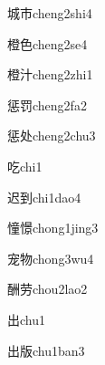 \begin{verbete}[9;5]{城市}{cheng2shi4}
\end{verbete}

\begin{verbete}[16;6]{橙色}{cheng2se4}
\end{verbete}

\begin{verbete}[16;5]{橙汁}{cheng2zhi1}
\end{verbete}

\begin{verbete}[12;9]{惩罚}{cheng2fa2}
\end{verbete}

\begin{verbete}[12;5]{惩处}{cheng2chu3}
\end{verbete}

\begin{verbete}[6]{吃}{chi1}
\end{verbete}

\begin{verbete}[7;8]{迟到}{chi1dao4}
\end{verbete}

\begin{verbete}[15;15]{憧憬}{chong1jing3}
\end{verbete}

\begin{verbete}[8;8]{宠物}{chong3wu4}
\end{verbete}

\begin{verbete}[13;7]{酬劳}{chou2lao2}
\end{verbete}

\begin{verbete}[5]{出}{chu1}
\end{verbete}

\begin{verbete}[5;8]{出版}{chu1ban3}
\end{verbete}

